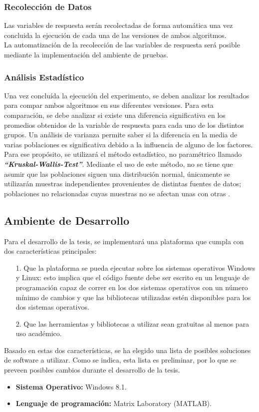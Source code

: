 \subsubsection{Recolecci\'on de Datos}
Las variables de respuesta ser\'an recolectadas de forma autom\'atica una vez concluida la ejecuci\'on de cada una de las versiones de ambos algoritmos.\\
La automatizaci\'on de la recolecci\'on de las variables de respuesta ser\'a posible mediante la implementaci\'on del ambiente de pruebas.
\subsubsection{An\'alisis Estad\'istico}
Una vez conclu\'ida la ejecuci\'on del experimento, se deben analizar los resultados para compar ambos algoritmos en sus diferentes versiones. Para esta comparaci\'on, se debe analizar si existe una diferencia significativa en los promedios obtenidos de la variable de respuesta para cada uno de los distintos grupos. Un an\'alisis de varianza permite saber si la diferencia en la media de varias poblaciones es significativa debido a la influencia de alguno de los factores.\\ Para ese prop\'osito, se utilizar\'a el m\'etodo estad\'istico, no param\'etrico llamado \textit{\textbf{\enquote{Kruskal-Wallis-Test}}}. Mediante el uso de este m\'etodo, no se tiene que asumir que las poblaciones siguen una distribuci\'on normal, \'unicamente se utilizar\'an muestras independientes provenientes de distintas fuentes de datos; poblaciones no relacionadas cuyas muestras no se afectan unas con otras \cite{kruskwal}.
\subsection{Ambiente de Desarrollo}
Para el desarrollo de la tesis, se implementar\'a una plataforma que cumpla con dos caracter\'isticas principales:
\begin{itemize}
\item [1.] Que la plataforma se pueda ejecutar sobre los sistemas operativos Windows y Linux: esto implica que el c\'odigo fuente debe ser escrito en un lenguaje de programaci\'on capaz de correr en los dos sistemas operativos con un n\'umero m\'inimo de cambios y que las bibliotecas utilizadas est\'en disponibles para los dos sistemas operativos.
\item [2.] Que las herramientas y bibliotecas a utilizar sean gratuitas al menos para uso acad\'emico.
\end{itemize}
Basado en estas dos caracter\'isticas, se ha elegido una lista de posibles soluciones de software a utilizar. Como se indica, esta lista es preliminar, por lo que se preveen posibles cambios durante el desarrollo de la tesis.
\begin{itemize}
\item \textbf{Sistema Operativo:} Windows 8.1.
\item \textbf{Lenguaje de programaci\'on:} Matrix Laboratory (MATLAB).
\end{itemize}
